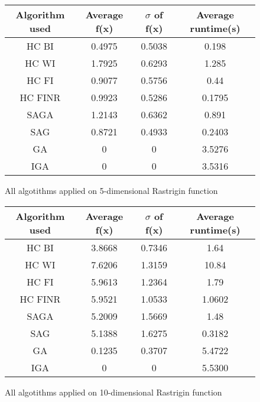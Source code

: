 \documentclass{article}
\begin{document}
\begin{figure}[H]
	\begin{tabular}{|c||c|c|c|} \hline
		Algorithm used & Average f(x) & $\sigma$ of f(x) & Average runtime(s) \\ \hline \hline
		HC BI & 0.4975 & 0.5038 & 0.198 \\ \hline
		HC WI & 1.7925 & 0.6293 & 1.285 \\ \hline
		HC FI & 0.9077 & 0.5756 & 0.44 \\ \hline
		HC FINR & 0.9923 & 0.5286 & 0.1795 \\ \hline
		SAGA & 1.2143 & 0.6362 & 0.891 \\ \hline
		SAG & 0.8721 & 0.4933 & 0.2403 \\ \hline
        GA & 0 & 0 & 3.5276 \\ \hline
		IGA & 0 & 0 & 3.5316 \\ \hline
\end{tabular}
\caption{All algotithms applied on 5-dimensional Rastrigin function}
\end{figure}

\begin{figure}[H]
	\begin{tabular}{|c||c|c|c|} \hline
		Algorithm used & Average f(x) & $\sigma$ of f(x) & Average runtime(s) \\ \hline \hline
		HC BI & 3.8668 & 0.7346 & 1.64 \\ \hline
		HC WI & 7.6206 & 1.3159 & 10.84 \\ \hline
		HC FI & 5.9613 & 1.2364 & 1.79 \\ \hline
		HC FINR & 5.9521 & 1.0533 & 1.0602 \\ \hline
		SAGA & 5.2009 & 1.5669 & 1.48 \\ \hline
		SAG & 5.1388 & 1.6275 & 0.3182 \\ \hline
        GA & 0.1235 & 0.3707 & 5.4722 \\ \hline
		IGA & 0 & 0 & 5.5300 \\ \hline
\end{tabular}
\caption{All algotithms applied on 10-dimensional Rastrigin function}
\end{figure}
\end{document}
